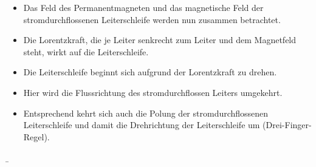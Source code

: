\begin{frame}
{\begin{minipage}{0.25\textwidth}
		\end{minipage}
		\begin{minipage}{0.74\textwidth}
			\begin{itemize}
				\item Das Feld des Permanentmagneten und das magnetische Feld der stromdurchflossenen Leiterschleife werden nun zusammen betrachtet.
				\item Die Lorentzkraft, die je Leiter senkrecht zum Leiter und dem Magnetfeld steht, wirkt auf die Leiterschleife. 
				\item Die Leiterschleife beginnt sich aufgrund der Lorentzkraft zu drehen.%
			\end{itemize}%
		\end{minipage}
		\begin{minipage}{0.25\textwidth}
		\end{minipage}
		\begin{minipage}{0.74\textwidth}
			\begin{itemize}
				\item Hier wird die Flussrichtung des stromdurchflossen Leiters umgekehrt.
				\item Entsprechend kehrt sich auch die Polung der stromdurchflossenen Leiterschleife und damit die Drehrichtung der Leiterschleife um (Drei-Finger-Regel).
			\end{itemize}
		\end{minipage}
	}
	\b{ %
		\begin{columns}
			\pause
			\pause
			\pause
\end{columns}}
\end{frame}
